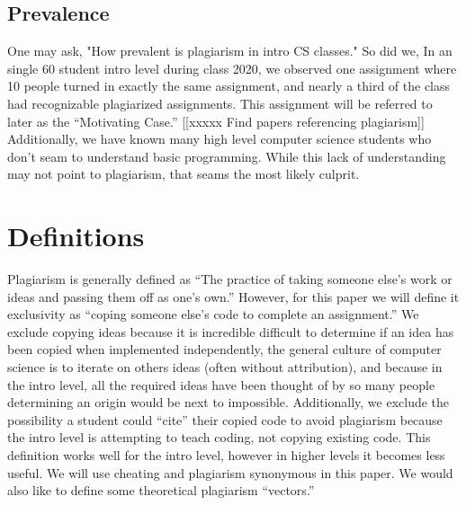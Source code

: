 \documentclass[conference]{IEEEtran}
\newcommand{\n}{\hfill\break}
\begin{document}
		\subsection{Prevalence}
		 One may ask, "How prevalent is plagiarism in intro CS classes." So did we, In an single 60 student intro level during class 2020, we observed one assignment where 10 people turned in exactly the same assignment, and nearly a third of the class had recognizable plagiarized assignments.   This assignment will be referred to later as the ``Motivating Case.''
		 [[xxxxx Find papers referencing plagiarism]]
		 Additionally, we have known many high level computer science students who don't seam to understand basic programming.  While this lack of understanding may not point to plagiarism, that seams the most likely culprit.
		
\n\section{\textbf{Definitions}}
Plagiarism is generally defined as ``The practice of taking someone else's work or ideas and passing them off as one's own.''\cite{oxed}  However, for this paper we will define it exclusivity as ``coping someone else's code to complete an assignment.''  We exclude copying ideas because it is incredible difficult to determine if an idea has been copied when implemented independently, the general culture of computer science is to iterate on others ideas (often without attribution), and because in the intro level, all the required ideas have been thought of by so many people determining an origin would be next to impossible.  Additionally, we exclude the possibility a student could ``cite'' their copied code to avoid plagiarism because the intro level is attempting to teach coding, not copying existing code.  This definition works well for the intro level, however in higher levels it becomes less useful.  We will use cheating and plagiarism synonymous in this paper.  We would also like to define some theoretical plagiarism ``vectors.''
\end{document}
